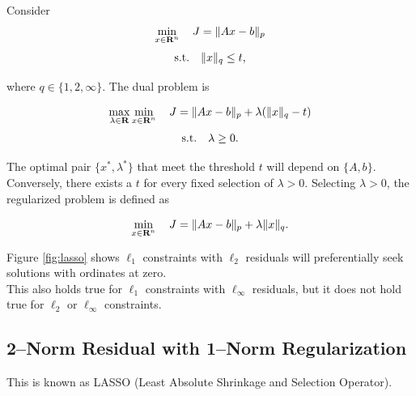 \documentclass{article}
\begin{document}

    Consider
    \begin{align*}
        \min_{x\in\textbf{R}^n}\quad J = \|Ax-b\|_p
    \end{align*}
    \begin{align*}
        \text{s.t.}\quad \|x\|_q\leq t,
    \end{align*}

    where $q\in\{1,2,\infty\}$.  The dual problem is \cite{KKT}

    \begin{align*}
        \max_{\lambda\in\textbf{R}}\min_{x\in\textbf{R}^n}\quad J = \|Ax-b\|_p+\lambda (\|x\|_q - t)
    \end{align*}
    \begin{align*}
        \text{s.t.}\quad \lambda\geq 0.
    \end{align*}

    The optimal pair $\{x^*,\lambda^*\}$ that meet the threshold $t$ will depend on $\{A,b\}$.  
    Conversely, there exists a $t$ for every fixed selection of $\lambda>0$.  Selecting
    $\lambda>0$, the regularized problem is defined as

    \begin{align}
        \min_{x\in\textbf{R}^n}\quad J = \|Ax-b\|_p+\lambda\|x\|_q.
    \end{align}

    Figure \ref{fig:lasso} shows $\ell_1$ constraints with $\ell_2$ residuals will
    preferentially seek solutions with ordinates at zero. \\
    This also holds true for $\ell_1$ constraints with $\ell_\infty$ residuals, but
    it does not hold true for $\ell_2$ or $\ell_\infty$ constraints.

\subsection{2--Norm Residual with 1--Norm Regularization}

    This is known as LASSO (Least Absolute Shrinkage and Selection Operator).\\ 
\end{document}
